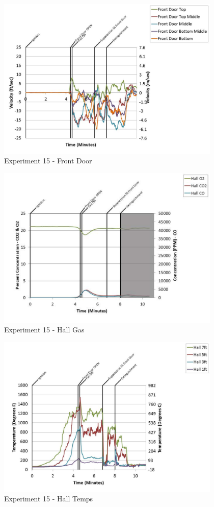 \documentclass{article}
\begin{document}
\begin{appendices}
	\begin{figure}[h!]
		\centering
		\includegraphics[height=3.05in]{0_Images/Results_Charts/Exp_15_Charts/FrontDoor.pdf}
		\caption{Experiment 15 - Front Door}
	\end{figure}
 
	\clearpage

	\begin{figure}[h!]
		\centering
		\includegraphics[height=3.05in]{0_Images/Results_Charts/Exp_15_Charts/HallGas.pdf}
		\caption{Experiment 15 - Hall Gas}
	\end{figure}
 

	\begin{figure}[h!]
		\centering
		\includegraphics[height=3.05in]{0_Images/Results_Charts/Exp_15_Charts/HallTemps.pdf}
		\caption{Experiment 15 - Hall Temps}
	\end{figure}
 

\end{appendices}
\end{document}

